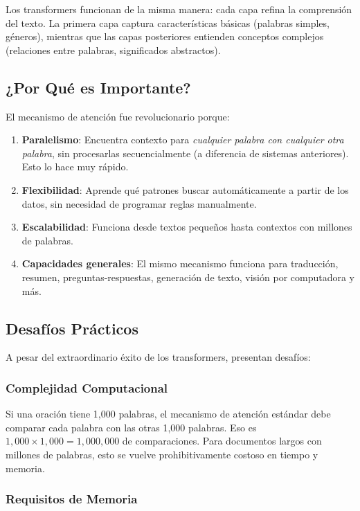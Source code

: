 \documentclass[11pt,a4paper]{article}
\begin{document}
Los transformers funcionan de la misma manera: cada capa refina la comprensión del texto. La primera capa captura características básicas (palabras simples, géneros), mientras que las capas posteriores entienden conceptos complejos (relaciones entre palabras, significados abstractos).

\subsection{¿Por Qué es Importante?}

El mecanismo de atención fue revolucionario porque:
\begin{enumerate}[leftmargin=*]
    \item \textbf{Paralelismo}: Encuentra contexto para \emph{cualquier palabra con cualquier otra palabra}, sin procesarlas secuencialmente (a diferencia de sistemas anteriores). Esto lo hace muy rápido.
    \item \textbf{Flexibilidad}: Aprende qué patrones buscar automáticamente a partir de los datos, sin necesidad de programar reglas manualmente.
    \item \textbf{Escalabilidad}: Funciona desde textos pequeños hasta contextos con millones de palabras.
    \item \textbf{Capacidades generales}: El mismo mecanismo funciona para traducción, resumen, preguntas-respuestas, generación de texto, visión por computadora y más.
\end{enumerate}

\subsection{Desafíos Prácticos}

A pesar del extraordinario éxito de los transformers, presentan desafíos:

\subsubsection{Complejidad Computacional}

Si una oración tiene 1,000 palabras, el mecanismo de atención estándar debe comparar cada palabra con las otras 1,000 palabras. Eso es $1,000 \times 1,000 = 1,000,000$ de comparaciones. Para documentos largos con millones de palabras, esto se vuelve prohibitivamente costoso en tiempo y memoria.

\subsubsection{Requisitos de Memoria}
\end{document}
